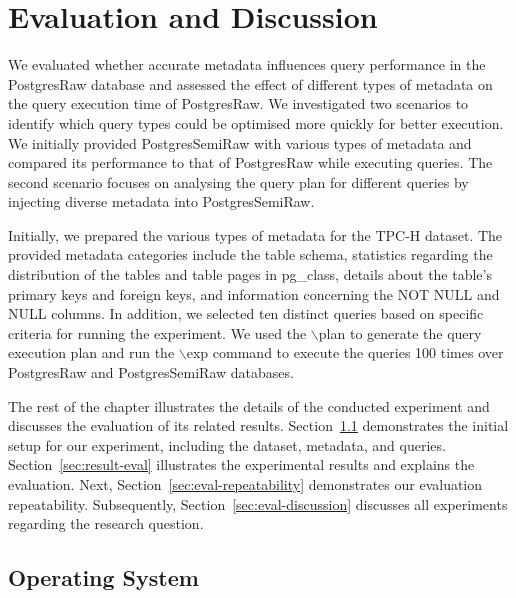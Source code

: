 
\chapter{Evaluation and Discussion}
\label{chapter:evaluation}

We evaluated whether accurate metadata influences query performance in the PostgresRaw database and assessed the effect of different types of metadata on the query execution time of PostgresRaw. We investigated two scenarios to identify which query types could be optimised more quickly for better execution. We initially provided PostgresSemiRaw with various types of metadata and compared its performance to that of PostgresRaw while executing queries. The second scenario focuses on analysing the query plan for different queries by injecting diverse metadata into PostgresSemiRaw.

Initially, we prepared the various types of metadata for the TPC-H dataset. The provided metadata categories include the table schema, statistics regarding the distribution of the tables and table pages in pg\_class, details about the table's primary keys and foreign keys, and information concerning the NOT NULL and NULL columns. In addition, we selected ten distinct queries based on specific criteria for running the experiment. We used the $\backslash$plan to generate the query execution plan and run the $\backslash$exp command to execute the queries 100 times over PostgresRaw and PostgresSemiRaw databases.

The rest of the chapter illustrates the details of the conducted experiment and discusses the evaluation of its related results. Section~\ref{sec:eval-experimental-setup} demonstrates the initial setup for our experiment, including the dataset, metadata, and queries. Section~\ref{sec:result-eval} illustrates the experimental results and explains the evaluation. Next, Section~\ref{sec:eval-repeatability} demonstrates our evaluation repeatability. Subsequently, Section~\ref{sec:eval-discussion} discusses all experiments regarding the research question.

\section{Operating System}
\label{sec:eval-experimental-setup}

